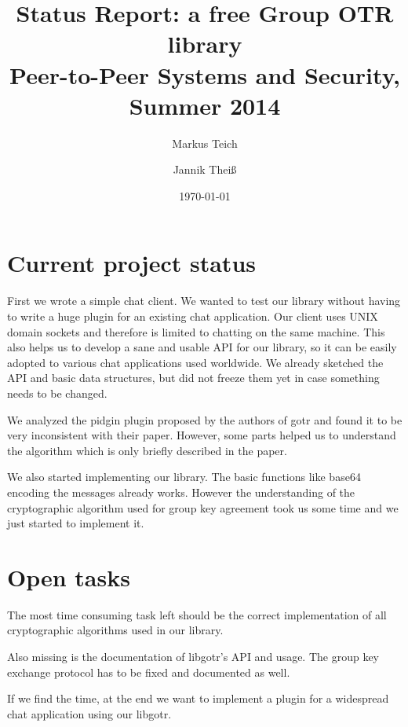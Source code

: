 

\title{Status Report: a free Group OTR library \\ {\small Peer-to-Peer Systems and Security, Summer 2014}}
\author{
	Markus Teich
	\and
	Jannik Theiß
}
\date{\today}



\maketitle


\section{Current project status}

First we wrote a simple chat client. We wanted to test our library without
having to write a huge plugin for an existing chat application. Our client uses
UNIX domain sockets and therefore is limited to chatting on the same machine.
This also helps us to develop a sane and usable API for our library, so it can
be easily adopted to various chat applications used worldwide. We already
sketched the API and basic data structures, but did not freeze them yet in case
something needs to be changed.

We analyzed the pidgin plugin proposed by the authors of gotr and found it to be
very inconsistent with their paper. However, some parts helped us to understand
the algorithm which is only briefly described in the paper.

We also started implementing our library. The basic functions like base64
encoding the messages already works. However the understanding of the
cryptographic algorithm used for group key agreement took us some time and we
just started to implement it.

\section{Open tasks}

The most time consuming task left should be the correct implementation of all
cryptographic algorithms used in our library.

Also missing is the documentation of libgotr's API and usage. The group key
exchange protocol has to be fixed and documented as well.

If we find the time, at the end we want to implement a plugin for a widespread
chat application using our libgotr.

